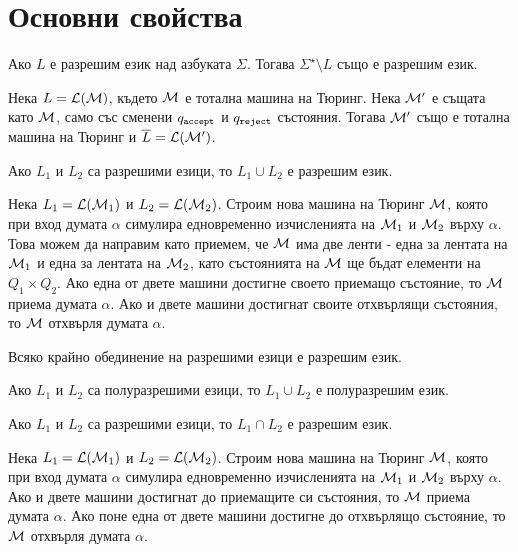 \section{Основни свойства}

\begin{proposition}
  Ако $L$ е разрешим език над азбуката $\Sigma$.
  Тогава $\Sigma^\star \setminus L$ също е разрешим език.
\end{proposition}
\begin{hint}
  Нека $L = \mathcal{L}(\mathcal{M})$, където $\mathcal{M}$ е тотална машина на Тюринг.
  Нека $\mathcal{M}'$ е същата като $\mathcal{M}$, само със сменени $q_{\texttt{accept}}$ и $q_{\texttt{reject}}$ състояния.
  Тогава $\mathcal{M}'$ също е тотална машина на Тюринг и $\overline{L} = \mathcal{L}(\mathcal{M}')$.
\end{hint}

\begin{proposition}
  Ако $L_1$ и $L_2$ са разрешими езици, то $L_1 \cup L_2$ е разрешим език.
\end{proposition}
\begin{hint}
  Нека $L_1 = \mathcal{L}(\mathcal{M}_1)$ и $L_2 = \mathcal{L}(\mathcal{M}_2)$.
  Строим нова машина на Тюринг $\mathcal{M}$, която при вход думата $\alpha$
  симулира едновременно изчисленията на $\mathcal{M}_1$ и $\mathcal{M}_2$ върху $\alpha$.
  Това можем да направим като приемем, че $\mathcal{M}$ има две ленти - една за лентата на $\mathcal{M}_1$ и една за лентата на $\mathcal{M}_2$,
  като състоянията на $\mathcal{M}$ ще бъдат елементи на $Q_1 \times Q_2$.
  Ако една от двете машини достигне своето приемащо състояние, то $\mathcal{M}$ приема думата $\alpha$.
  Ако и двете машини достигнат своите отхвърлящи състояния, то $\mathcal{M}$ отхвърля думата $\alpha$.
\end{hint}

\begin{cor}
  Всяко крайно обединение на разрешими езици е разрешим език.
\end{cor}

\begin{proposition}
  Ако $L_1$ и $L_2$ са полуразрешими езици, то $L_1 \cup L_2$ е полуразрешим език.
\end{proposition}

\begin{proposition}
  Ако $L_1$ и $L_2$ са разрешими езици, то $L_1 \cap L_2$ е разрешим език.
\end{proposition}
\begin{hint}
  Нека $L_1 = \mathcal{L}(\mathcal{M}_1)$ и $L_2 = \mathcal{L}(\mathcal{M}_2)$.
  Строим нова машина на Тюринг $\mathcal{M}$, която при вход думата $\alpha$
  симулира едновременно изчисленията на $\mathcal{M}_1$ и $\mathcal{M}_2$ върху $\alpha$.
  Ако и двете машини достигнат до приемащите си състояния, то $\mathcal{M}$ приема думата $\alpha$.
  Ако поне една от двете машини достигне до отхвърлящо състояние, то $\mathcal{M}$ отхвърля думата $\alpha$.
\end{hint}

